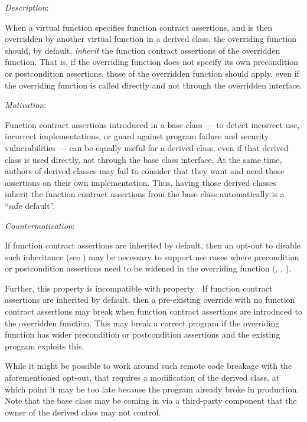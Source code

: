 
\emph{Description}:

When a virtual function specifies function contract assertions, and is then overridden by another virtual function in a derived class, the overriding function should, by default, \emph{inherit} the function contract assertions of the overridden function. That is, if the overriding function does not specify its own precondition or postcondition assertions, those of the overridden function should apply, even if the overriding function is called directly and not through the overridden interface.

\emph{Motivation}:

Function contract assertions introduced in a base class --- to detect incorrect use, incorrect implementations, or guard against program failure and security vulnerabilities --- can be equally useful for a derived class, even if that derived class is used directly, not through the base class interface.  At the same time, authors of derived classes may fail to consider that they want and need those assertions on their own implementation. Thus, having those derived classes inherit the function contract assertions from the base class automatically is a ``safe default''.

\emph{Countermotivation}:

If function contract assertions are inherited by default, then an opt-out to disable such inheritance (see ) may be necessary to support use cases where precondition or postcondition assertions need to be widened in the overriding function (, , ). 

Further, this property is incompatible with property . If function contract assertions are inherited by default, then a pre-existing override with no function contract assertions may break when function contract assertions are introduced to the overridden function. This may break a correct program if the overriding function has wider precondition or postcondition assertions and the existing program exploits this.

While it might be possible to work around such remote code breakage with the aforementioned opt-out, that requires a modification of the derived class, at which point it may be too late because the program already broke in production. Note that the base class may be coming in via a third-party component that the owner of the derived class may not control.

